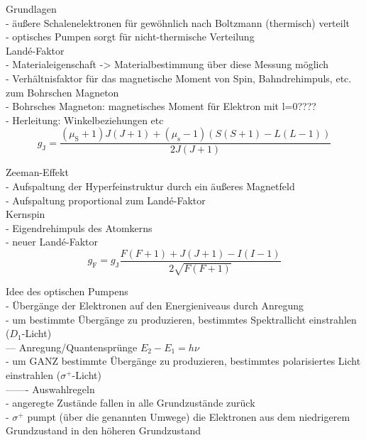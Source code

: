 Grundlagen\\
- äußere Schalenelektronen für gewöhnlich nach Boltzmann (thermisch) verteilt\\
- optisches Pumpen sorgt für nicht-thermische Verteilung\\

Landé-Faktor\\
- Materialeigenschaft -> Materialbestimmung über diese Messung möglich\\
- Verhältnisfaktor für das magnetische Moment von Spin, Bahndrehimpuls, etc. zum Bohrschen Magneton\\
- Bohrsches Magneton: magnetisches Moment für Elektron mit l=0????\\
- Herleitung: Winkelbeziehungen etc\\
\begin{equation}
  g_{\text{J}}= \frac{\left(\mu_{\text{S}} +1 \right)J\left(J+1\right) + \left(\mu_{\text{s}}-1\right) \left( S\left(S+1\right)-L\left(L-1\right) \right)   }{2J\left(J+1\right)}
\label{eqn:landej}
\end{equation}

Zeeman-Effekt\\
- Aufspaltung der Hyperfeinstruktur durch ein äußeres Magnetfeld\\
- Aufspaltung proportional zum Landé-Faktor\\

Kernspin\\
- Eigendrehimpuls des Atomkerns\\
- neuer Landé-Faktor\\
\begin{equation}
  g_{\text{F}}= g_{\text{J}} \frac{ F\left(F+1\right) + J\left(J+1\right) - I\left(I-1\right)  }{2 \sqrt{F\left(F+1\right)}}
\label{eqn:landef}
\end{equation}

Idee des optischen Pumpens\\
- Übergänge der Elektronen auf den Energieniveaus durch Anregung\\
- um bestimmte Übergänge zu produzieren, bestimmtes Spektrallicht einstrahlen ($D_{1}$-Licht)\\
  --- Anregung/Quantensprünge $E_{2}-E_{1}=h \nu$\\
- um GANZ bestimmte Übergänge zu produzieren, bestimmtes polarisiertes Licht einstrahlen ($\sigma^{+}$-Licht)\\
  ——- Auswahlregeln\\
- angeregte Zustände fallen in alle Grundzustände zurück\\
- $\sigma^{+}$ pumpt (über die genannten Umwege) die Elektronen aus dem niedrigerem Grundzustand in den höheren Grundzustand\\

